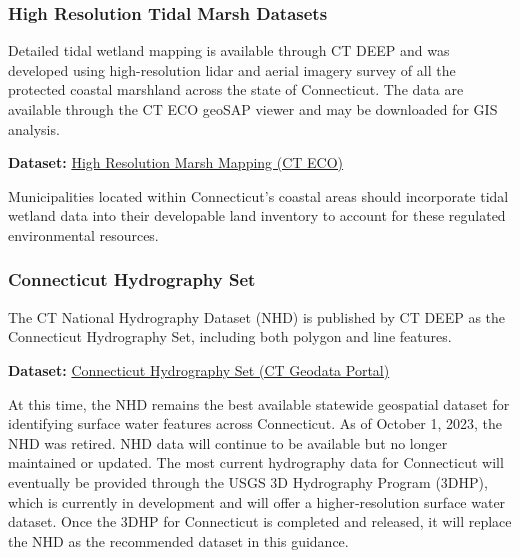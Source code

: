 \documentclass[
  letterpaper,
  DIV=11,
  numbers=noendperiod]{scrreprt}
\begin{document}
\subsubsection{High Resolution Tidal Marsh
Datasets}\label{sec-high-resolution-tidal-marsh-datasets}

Detailed tidal wetland mapping is available through CT DEEP and was
developed using high-resolution lidar and aerial imagery survey of all
the protected coastal marshland across the state of Connecticut. The
data are available through the CT ECO geoSAP viewer and may be
downloaded for GIS analysis.

\textbf{Dataset:}
\href{https://maps.cteco.uconn.edu/projects/highres_marsh/}{High
Resolution Marsh Mapping (CT ECO)}

\begin{tcolorbox}[enhanced jigsaw, arc=.35mm, bottomrule=.15mm, breakable, colback=white, colframe=quarto-callout-note-color-frame, left=2mm, leftrule=.75mm, opacityback=0, rightrule=.15mm, toprule=.15mm]
\begin{minipage}[t]{5.5mm}
\textcolor{quarto-callout-note-color}{\faInfo}
\end{minipage}%
\begin{minipage}[t]{\textwidth - 5.5mm}

Municipalities located within Connecticut's coastal areas should
incorporate tidal wetland data into their developable land inventory to
account for these regulated environmental resources.

\end{minipage}%
\end{tcolorbox}

\subsubsection{Connecticut Hydrography
Set}\label{sec-connecticut-hydrography-set}

The CT National Hydrography Dataset (NHD) is published by CT DEEP as the
Connecticut Hydrography Set, including both polygon and line features.

\textbf{Dataset:}
\href{https://geodata.ct.gov/maps/ef85cf0c55394065a8a74ea97fbd7ede/about}{Connecticut
Hydrography Set (CT Geodata Portal)}

At this time, the NHD remains the best available statewide geospatial
dataset for identifying surface water features across Connecticut. As of
October 1, 2023, the NHD was retired. NHD data will continue to be
available but no longer maintained or updated. The most current
hydrography data for Connecticut will eventually be provided through the
USGS 3D Hydrography Program (3DHP), which is currently in development
and will offer a higher‑resolution surface water dataset. Once the 3DHP
for Connecticut is completed and released, it will replace the NHD as
the recommended dataset in this guidance.
\end{document}
